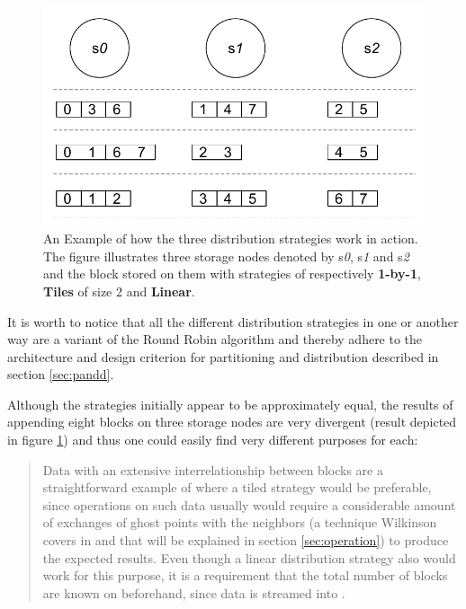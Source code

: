 \begin{figure}[ht!]
	\centering
	\includegraphics[scale=0.85]{pdf/distribution-strategies.pdf}
	\vspace*{3mm}
	\caption[Distribution strategies]{An Example of how the three distribution strategies work in action. The figure illustrates three storage nodes denoted by s\textit{0}, s\textit{1} and s\textit{2} and the block stored on them with strategies of respectively \textbf{1-by-1}, \textbf{Tiles} of size 2 and \textbf{Linear}. \label{fig:distribution-strategies}}
\end{figure}	

It is worth to notice that all the different distribution strategies in one or another way are a variant of the Round Robin algorithm and thereby adhere to the architecture and design criterion for partitioning and distribution described in section \ref{sec:pandd}.
\newline

Although the strategies initially appear to be approximately equal, the results of appending eight blocks on three storage nodes are very divergent (result depicted in figure \ref{fig:distribution-strategies}) and thus one could easily find very different purposes for each:

\begin{quotation}
Data with an extensive interrelationship between blocks are a straightforward example of where a tiled strategy would be preferable, since operations on such data usually would require a considerable amount of exchanges of ghost points with the neighbors (a technique Wilkinson \etal covers in \cite{Wilkinson:1998:PPT:289352} and that will be explained in section \ref{sec:operation}) to produce the expected results. Even though a linear distribution strategy also would work for this purpose, it is a requirement that the total number of blocks are known on beforehand, since data is streamed into \CodeName.
\end{quotation}

